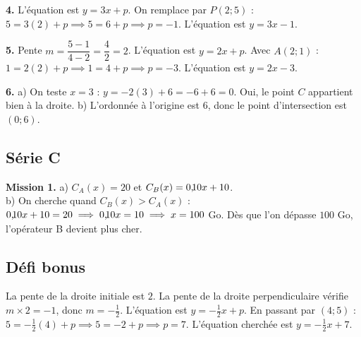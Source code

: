 \documentclass[../main.tex]{subfiles}
\begin{document}
\textbf{4.} L'équation est $y = 3x + p$. On remplace par $P(2; 5)$ : $5 = 3(2) + p \implies 5 = 6 + p \implies p = -1$. L'équation est $y = 3x - 1$.

\textbf{5.} Pente $m = \dfrac{5 - 1}{4 - 2} = \dfrac{4}{2} = 2$. L'équation est $y = 2x + p$. Avec $A(2; 1)$ : $1 = 2(2) + p \implies 1 = 4 + p \implies p = -3$. L'équation est $y = 2x - 3$.

\textbf{6.} a) On teste $x = 3$ : $y = -2(3) + 6 = -6 + 6 = 0$. Oui, le point $C$ appartient bien à la droite. \quad b) L'ordonnée à l'origine est $6$, donc le point d'intersection est $(0; 6)$.

\subsection*{Série C}

\textbf{Mission 1.} 
a) $C_A(x) = 20$ et $C_B(x) = 0\text{,\!}10x + 10$. \\
b) On cherche quand $C_B(x) > C_A(x)$ : $0\text{,\!}10x + 10 = 20 \implies 0\text{,\!}10x = 10 \implies x = 100$ Go. Dès que l'on dépasse $100$ Go, l'opérateur B devient plus cher.

\subsection*{Défi bonus}
La pente de la droite initiale est $2$. La pente de la droite perpendiculaire vérifie $m \times 2 = -1$, donc $m = -\frac{1}{2}$. L'équation est $y = -\frac{1}{2}x + p$. En passant par $(4; 5)$ : $5 = -\frac{1}{2}(4) + p \implies 5 = -2 + p \implies p = 7$. L'équation cherchée est $y = -\frac{1}{2}x + 7$.
\end{document}
